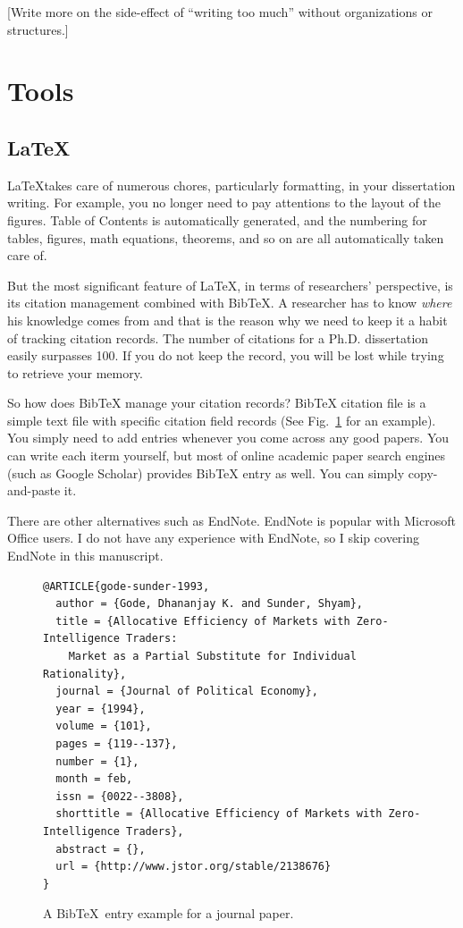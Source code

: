 \documentclass[11pt]{article}
\begin{document}
[Write more on the side-effect of ``writing too much'' without organizations
or structures.]

\section{Tools}

\subsection{\LaTeX}

\LaTeX takes care of numerous chores, particularly formatting, in your
dissertation writing.  For example, you no longer need to pay attentions to
the layout of the figures.  Table of Contents is automatically generated, and
the numbering for tables, figures, math equations, theorems, and so on are all
automatically taken care of.

But the most significant feature of \LaTeX, in terms of researchers'
perspective, is its citation management combined with BibTeX. A researcher has
to know \emph{where} his knowledge comes from and that is the reason why we
need to keep it a habit of tracking citation records.  The number of citations
for a Ph.D. dissertation easily surpasses 100.  If you do not keep the record,
you will be lost while trying to retrieve your memory.

So how does BibTeX manage your citation records? BibTeX citation file is a
simple text file with specific citation field records (See
Fig.~\ref{fig:bibtex-example} for an example). You simply need to add entries
whenever you come across any good papers. You can write each iterm yourself,
but most of online academic paper search engines (such as Google Scholar)
provides BibTeX entry as well. You can simply copy-and-paste it.

There are other alternatives such as EndNote. EndNote is popular with
Microsoft Office users. I do not have any experience with EndNote, so I skip
covering EndNote in this manuscript. 

\begin{figure}[ht]
    \begin{center}
    \begin{footnotesize}
\begin{verbatim}
@ARTICLE{gode-sunder-1993,
  author = {Gode, Dhananjay K. and Sunder, Shyam},
  title = {Allocative Efficiency of Markets with Zero-Intelligence Traders:
    Market as a Partial Substitute for Individual Rationality},
  journal = {Journal of Political Economy},
  year = {1994},
  volume = {101},
  pages = {119--137}, 
  number = {1},
  month = feb,
  issn = {0022--3808},
  shorttitle = {Allocative Efficiency of Markets with Zero-Intelligence Traders},
  abstract = {},
  url = {http://www.jstor.org/stable/2138676}
}
\end{verbatim}
    \end{footnotesize}
    \end{center}
    \caption{A BibTeX~entry example for a journal paper.}
    \label{fig:bibtex-example}
\end{figure}
\end{document}
